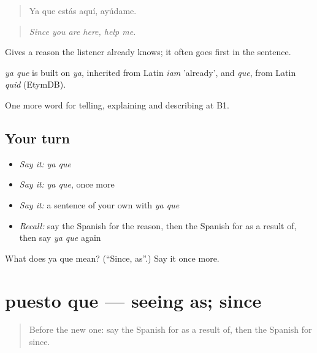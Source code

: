 \begin{quote}
Ya que estás aquí, ayúdame.
\end{quote}

\begin{quote}
\emph{Since you are here, help me.}
\end{quote}

Gives a reason the listener already knows; it often goes first in the sentence.

\begin{cousinweb}
\emph{ya que} is built on \emph{ya}, inherited from Latin \emph{iam} 'already', and \emph{que}, from Latin \emph{quid} (EtymDB).
\end{cousinweb}

\begin{grammarlens}[title={What you've built}]
One more word for telling, explaining and describing at B1.
\end{grammarlens}

\subsection*{Your turn}
\begin{itemize}
\raggedright
  \item \emph{Say it:} \emph{ya que}
  \item \emph{Say it:} \emph{ya que}, once more
  \item \emph{Say it:} a sentence of your own with \emph{ya que}
  \item \emph{Recall:} say the Spanish for the reason, then the Spanish for as a result of, then say \emph{ya que} again
\end{itemize}

\begin{tcolorbox}[breakable,colback=teal!4,colframe=teal!35!black,title={Before you move on}]
What does ya que mean? (\textquotedblleft{}Since, as\textquotedblright{}.) Say it once more.
\end{tcolorbox}
\section[puesto que]{puesto que — seeing as; since}

\label{lesson:ES-C580-puesto-que}



\begin{quote}
Before the new one: say the Spanish for as a result of, then the Spanish for since.
\end{quote}

